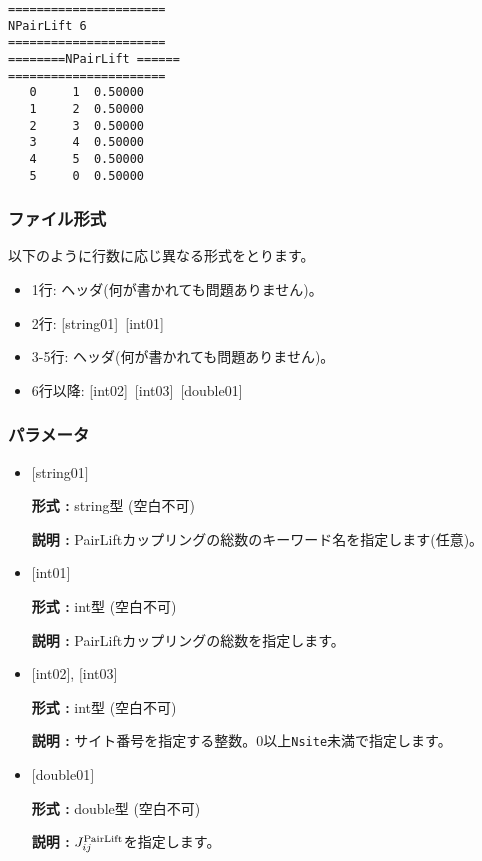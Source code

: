 \begin{minipage}{12.5cm}
\begin{screen}
\begin{verbatim}
====================== 
NPairLift 6  
====================== 
========NPairLift ====== 
====================== 
   0     1  0.50000
   1     2  0.50000
   2     3  0.50000
   3     4  0.50000
   4     5  0.50000
   5     0  0.50000
\end{verbatim}
\end{screen}
\end{minipage}

\subsubsection{ファイル形式}
以下のように行数に応じ異なる形式をとります。
 \begin{itemize}
   \item  1行:  ヘッダ(何が書かれても問題ありません)。
   \item  2行:   [string01]~[int01]
   \item  3-5行:  ヘッダ(何が書かれても問題ありません)。
   \item  6行以降:
   [int02]~[int03]~[double01] 
  \end{itemize}
\subsubsection{パラメータ}
 \begin{itemize}

   \item  $[$string01$]$
   
    {\bf 形式 :} string型 (空白不可)

   {\bf 説明 :} PairLiftカップリングの総数のキーワード名を指定します(任意)。

   \item  $[$int01$]$
   
    {\bf 形式 :} int型 (空白不可)

   {\bf 説明 :} PairLiftカップリングの総数を指定します。

  \item  $[$int02$]$, $[$int03$]$
  
 {\bf 形式 :} int型 (空白不可)

{\bf 説明 :} サイト番号を指定する整数。0以上\verb|Nsite|{未満}で指定します。
 
 \item  $[$double01$]$
   
   {\bf 形式 :} double型 (空白不可)

  {\bf 説明 :}  $J_{ij}^{\rm PairLift}$を指定します。
  
\end{itemize}

